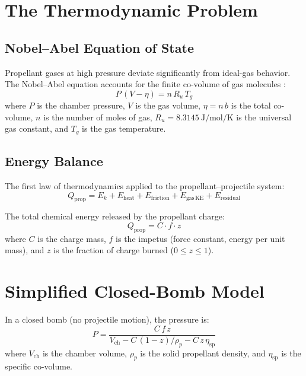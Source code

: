 \documentclass[11pt,twoside,openright]{report}
\begin{document}
\section{The Thermodynamic Problem}

\subsection{Nobel--Abel Equation of State}

Propellant gases at high pressure deviate significantly from ideal-gas behavior. The Nobel--Abel equation accounts for the finite co-volume of gas molecules \citep{mccoy1999modern, carlucci2007ballistics}:
\begin{equation}
  P\,(V - \eta) = n\,R_u\,T_g
  \label{eq:nobel_abel}
\end{equation}
where $P$ is the chamber pressure, $V$ is the gas volume, $\eta = n\,b$ is the total co-volume, $n$ is the number of moles of gas, $R_u = \SI{8.3145}{\joule\per\mole\per\kelvin}$ is the universal gas constant, and $T_g$ is the gas temperature.

\subsection{Energy Balance}

The first law of thermodynamics applied to the propellant--projectile system:
\begin{equation}
  Q_{\mathrm{prop}} = E_k + E_{\mathrm{heat}} + E_{\mathrm{friction}} + E_{\mathrm{gas\,KE}} + E_{\mathrm{residual}}
  \label{eq:energy_balance}
\end{equation}

The total chemical energy released by the propellant charge:
\begin{equation}
  Q_{\mathrm{prop}} = C \cdot f \cdot z
  \label{eq:Q_prop}
\end{equation}
where $C$ is the charge mass, $f$ is the impetus (force constant, energy per unit mass), and $z$ is the fraction of charge burned ($0 \le z \le 1$).

\section{Simplified Closed-Bomb Model}

In a closed bomb (no projectile motion), the pressure is:
\begin{equation}
  P = \frac{C\,f\,z}{V_{\mathrm{ch}} - C\,(1-z)/\rho_p - C\,z\,\eta_{\mathrm{sp}}}
  \label{eq:closed_bomb}
\end{equation}
where $V_{\mathrm{ch}}$ is the chamber volume, $\rho_p$ is the solid propellant density, and $\eta_{\mathrm{sp}}$ is the specific co-volume.
\end{document}
